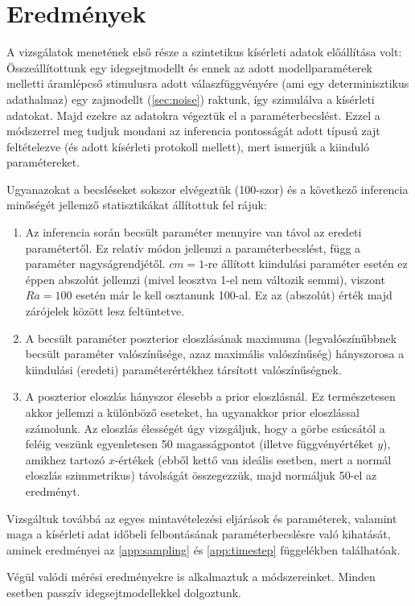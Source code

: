 \section{Eredmények}
A vizsgálatok menetének első része a szintetikus kísérleti adatok előállítása volt: Összeállítottunk egy idegsejtmodellt és ennek az adott modellparaméterek melletti áramlépcső stimulusra adott válaszfüggvényére (ami egy determinisztikus adathalmaz) egy zajmodellt (\ref{sec:noise}) raktunk, így szimulálva a kísérleti adatokat. Majd ezekre az adatokra végeztük el a paraméterbecslést. Ezzel a módszerrel meg tudjuk mondani az inferencia pontosságát adott típusú zajt feltételezve (és adott kísérleti protokoll mellett), mert ismerjük a kiinduló paramétereket.

Ugyanazokat a becsléseket sokszor elvégeztük (100-szor) és a következő inferencia minőségét jellemző statisztikákat állítottuk fel rájuk:
\begin{enumerate}
	\item Az inferencia során becsült paraméter mennyire van távol az eredeti paramétertől. Ez relatív módon jellemzi a paraméterbecslést, függ a paraméter nagyságrendjétől. $cm = 1$-re állított kiindulási paraméter esetén ez éppen abszolút jellemzi (mivel leosztva 1-el nem változik semmi), viszont $Ra = 100$ esetén már le kell osztanunk 100-al. Ez az (abszolút) érték majd zárójelek között lesz feltüntetve.
	\item A becsült paraméter poszterior eloszlásának maximuma (legvalószínűbbnek becsült paraméter valószínűsége, azaz maximális valószínűség) hányszorosa a kiindulási (eredeti) paraméterértékhez társított valószínűségnek.
	\item A poszterior eloszlás hányszor élesebb a prior eloszlásnál. Ez természetesen akkor jellemzi a különböző eseteket, ha ugyanakkor prior eloszlással számolunk. Az eloszlás élességét úgy vizsgáljuk, hogy a görbe csúcsától a feléig veszünk egyenletesen 50 magasságpontot (illetve függvényértéket $y$), amikhez tartozó $x$-értékek (ebből kettő van ideális esetben, mert a normál eloszlás szimmetrikus) távolságát összegezzük, majd normáljuk 50-el az eredményt.
\end{enumerate}

Vizsgáltuk továbbá az egyes mintavételezési eljárások és paraméterek, valamint maga a kísérleti adat időbeli felbontásának paraméterbecslésre való kihatását, aminek eredményei az \ref{app:sampling} és \ref{app:timestep} függelékben találhatóak.

Végül valódi mérési eredményekre is alkalmaztuk a módszereinket. Minden esetben passzív idegsejtmodellekkel dolgoztunk.

